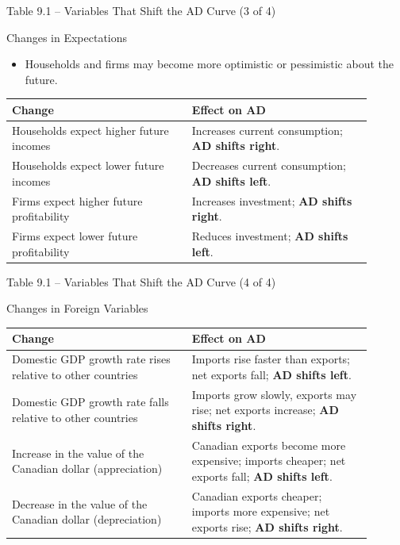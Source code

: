 \documentclass[aspectratio=169]{beamer}
\begin{document}
\begin{frame}{Table 9.1 -- Variables That Shift the AD Curve (3 of 4)}
\transfade
\begin{block}{Changes in Expectations}
\end{block}
\begin{itemize}[<+->]
  \item Households and firms may become more optimistic or pessimistic about the future.
\end{itemize}
\begin{table}[h]
\centering
\begin{tabular}{p{0.45\linewidth} p{0.45\linewidth}}
\toprule
\textbf{Change} & \textbf{Effect on AD} \\
\midrule
Households expect higher future incomes & Increases current consumption; \textbf{AD shifts right}. \\
Households expect lower future incomes & Decreases current consumption; \textbf{AD shifts left}. \\
Firms expect higher future profitability & Increases investment; \textbf{AD shifts right}. \\
Firms expect lower future profitability & Reduces investment; \textbf{AD shifts left}. \\
\bottomrule
\end{tabular}
\end{table}
\end{frame}

\begin{frame}{Table 9.1 -- Variables That Shift the AD Curve (4 of 4)}
\transfade
\begin{block}{Changes in Foreign Variables}
\end{block}
\begin{table}[h]
\centering
\begin{tabular}{p{0.45\linewidth} p{0.45\linewidth}}
\toprule
\textbf{Change} & \textbf{Effect on AD} \\
\midrule
Domestic GDP growth rate rises relative to other countries & Imports rise faster than exports; net exports fall; \textbf{AD shifts left}. \\
Domestic GDP growth rate falls relative to other countries & Imports grow slowly, exports may rise; net exports increase; \textbf{AD shifts right}. \\
Increase in the value of the Canadian dollar (appreciation) & Canadian exports become more expensive; imports cheaper; net exports fall; \textbf{AD shifts left}. \\
Decrease in the value of the Canadian dollar (depreciation) & Canadian exports cheaper; imports more expensive; net exports rise; \textbf{AD shifts right}. \\
\bottomrule
\end{tabular}
\end{table}
\end{frame}
\end{document}
